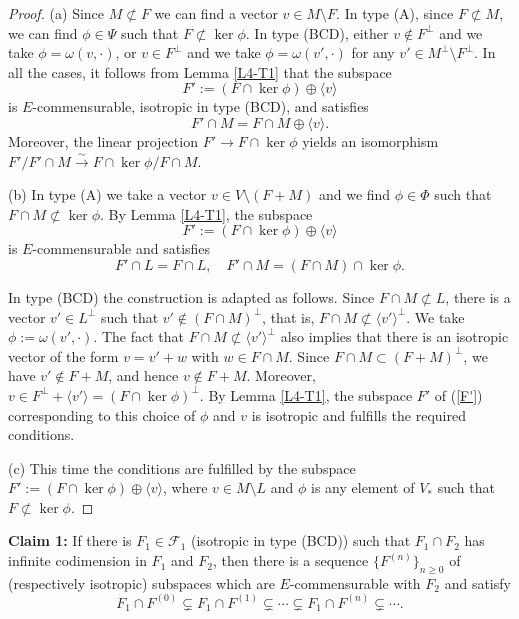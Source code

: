 \documentclass[12pt]{amsart}
\newcommand{\Ff}{\mathcal{F}}
\renewcommand{\span}[1]{\langle #1\rangle}
\numberwithin{equation}{section}
\theoremstyle{definition}
\begin{document}
\begin{proof}
{\rm (a)} Since $M\not\subset F$ we can find a vector $v\in M\setminus F$.
In type (A), since $F\not\subset M$, we can find $\phi\in\Psi$ such that $F\not\subset \ker\phi$.
In type (BCD), either $v\notin F^\perp$ and we take $\phi=\omega(v,\cdot)$,
or $v\in F^\perp$ and we take $\phi=\omega(v',\cdot)$ for any $v'\in M^\perp\setminus F^\perp$.
In all the cases, it follows from Lemma \ref{L4-T1} that the subspace
\[
F':=(F\cap \ker\phi)\oplus\span{v}
\]
is $E$-commensurable, isotropic in type (BCD), and satisfies
\[
F'\cap M=F\cap M\oplus\span{v}.
\]
Moreover, the linear projection $F'\to F\cap\ker\phi$ yields an isomorphism  $F'/F'\cap M\stackrel{\sim}{\to} F\cap\ker\phi/F\cap M$.

{\rm (b)} 
In type (A) we take a vector $v\in V\setminus (F+M)$ and we find $\phi\in\Phi$ such that $F\cap M\not\subset \ker\phi$.
By Lemma \ref{L4-T1}, the subspace
\begin{equation}
\label{F'}
F':=(F\cap\ker\phi)\oplus\span{v}
\end{equation}
is $E$-commensurable and satisfies
\[
F'\cap L=F\cap L,\quad F'\cap M=(F\cap M)\cap\ker\phi.
\]

In type (BCD) the construction is adapted as follows.
Since $F\cap M\not\subset L$, there is a vector $v'\in L^\perp$ such that $v'\notin(F\cap M)^\perp$,
that is, $F\cap M\not\subset\span{v'}^\perp$. We take $\phi:=\omega(v',\cdot)$.
The fact that $F\cap M\not\subset \span{v'}^\perp$ also implies that there is an isotropic vector of the
form $v=v'+w$ with $w\in F\cap M$.
Since $F\cap M\subset (F+M)^\perp$, we have $v'\notin F+M$, and hence $v\notin F+M$.
Moreover, 
$v\in F^\perp+\span{v'}=(F\cap \ker\phi)^\perp$.
By Lemma \ref{L4-T1}, the subspace $F'$ of (\ref{F'}) corresponding to this choice of $\phi$ and $v$ is isotropic and fulfills the required conditions.

{\rm (c)} This time the conditions are fulfilled by the subspace $F':=(F\cap\ker\phi)\oplus\span{v}$, where $v\in M\setminus L$ and $\phi$ is any element of $V_*$ such that $F\not\subset\ker\phi$.
\end{proof}

{\bf Claim 1:} If there is $F_1\in\Ff_1$ (isotropic in type (BCD)) such that $F_1\cap F_2$ has infinite codimension in $F_1$ and $F_2$,
then there is a sequence $\{F^{(n)}\}_{n\geq 0}$ of (respectively isotropic) subspaces which are $E$-commensurable with $F_2$ and satisfy
\[F_1\cap F^{(0)}\subsetneq F_1\cap F^{(1)}\subsetneq\cdots\subsetneq F_1\cap F^{(n)}\subsetneq\cdots.\]
\end{document}
